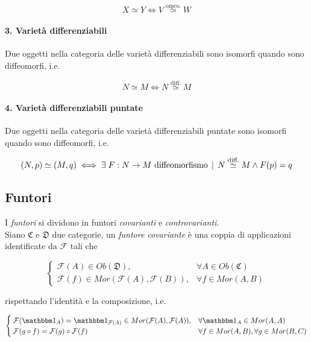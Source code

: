 \begin{equation}
	X \simeq Y \iff V \stackrel{\text{omeo.}}{\simeq} W
\end{equation}

\paragraph{3. Varietà differenziabili}

Due oggetti nella categoria delle varietà differenziabili sono isomorfi quando sono diffeomorfi, i.e.

\begin{equation}
	N \simeq M \iff N \stackrel{\text{diff.}}{\simeq} M
\end{equation}

\paragraph{4. Varietà differenziabili puntate}

Due oggetti nella categoria delle varietà differenziabili puntate sono isomorfi quando sono diffeomorfi, i.e.

\begin{equation}
	(N,p) \simeq (M,q) \iff \exists \; F : N \to M \text{ diffeomorfismo} \, \mid \, N \stackrel{\text{diff.}}{\simeq} M \wedge F(p)=q
\end{equation}

\subsection{Funtori}

I \textit{funtori} si dividono in funtori \textit{covarianti} e \textit{controvarianti}.\\
Siano $ \mathfrak{C} $ e $ \mathfrak{D} $ due categorie, un \textit{funtore covariante} è una coppia di applicazioni identificate da $ \mathcal{F} $ tali che

\begin{equation}
	\begin{cases}
		\mathcal{F}(A) \in Ob(\mathfrak{D}), & \forall A \in Ob(\mathfrak{C})\\
		\mathcal{F}(f) \in Mor(\mathcal{F}(A),\mathcal{F}(B)), & \forall f \in Mor(A,B)
	\end{cases}
\end{equation}

rispettando l'identità e la composizione, i.e.

\begin{equation}
	\begin{cases}
		\mathcal{F}(\bigone_{A}) = \bigone_{\mathcal{F}(A)} \in Mor(\mathcal{F}(A),\mathcal{F}(A)), & \forall \bigone_{A} \in Mor(A,A)\\
		\mathcal{F}(g \circ f) = \mathcal{F}(g) \circ \mathcal{F}(f) & \forall f \in Mor(A,B), \forall g \in Mor(B,C)
	\end{cases}
\end{equation}

